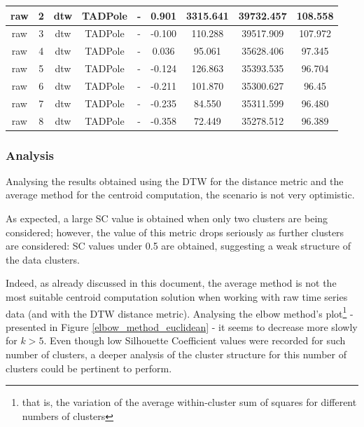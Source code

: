 \documentclass[9pt,journal,compsoc]{IEEEtran}
\begin{document}
\begin{table}[t]
\begin{tabular}{|c|c|c|c|c|c|c|c|c|}
      	raw & 2 & dtw & TADPole & - & 0.901 & 3315.641 & 39732.457 & 108.558 \\ \hline
        raw & 3 & dtw & TADPole & - & -0.100 & 110.288 & 39517.909 & 107.972 \\ \hline
        raw & 4 & dtw & TADPole & - & 0.036 & 95.061 & 35628.406 & 97.345 \\ \hline
        raw & 5 & dtw & TADPole & - & -0.124 & 126.863 & 35393.535 & 96.704 \\ \hline
        raw & 6 & dtw & TADPole & - & -0.211 & 101.870 & 35300.627 & 96.45 \\ \hline
        raw & 7 & dtw & TADPole & - & -0.235 & 84.550 & 35311.599 & 96.480 \\ \hline
        raw & 8 & dtw & TADPole & - & -0.358 & 72.449 & 35278.512 & 96.389 \\ \hline
	\end{tabular}
\end{table}

\subsubsection{Analysis}

Analysing the results obtained using the DTW for the distance metric and the average method for the centroid computation, the scenario is not very optimistic.

As expected, a large SC value is obtained when only two clusters are being considered; however, the value of this metric drops seriously as further clusters are considered: SC values under 0.5 are obtained, suggesting a weak structure of the data clusters.

Indeed, as already discussed in this document, the average method is not the most suitable centroid computation solution when working with raw time series data (and with the DTW distance metric). Analysing the elbow method's plot\footnote{that is, the variation of the average within-cluster sum of squares for different numbers of clusters} - presented in Figure \ref{elbow_method_euclidean} - it seems to decrease more slowly for $k > 5$. Even though low Silhouette Coefficient values were recorded for such number of clusters, a deeper analysis of the cluster structure for this number of clusters could be pertinent to perform.
\end{document}
